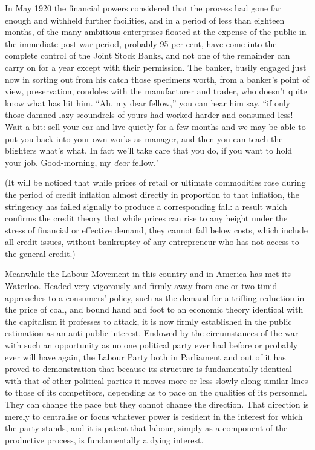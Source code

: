 \documentclass{book}
\begin{document}
In May 1920 the financial powers considered that the process had gone far enough and withheld further facilities, and in a period of less than eighteen months, of the many ambitious enterprises floated at the expense of the public in the immediate post-war period, probably 95 per cent, have come into the complete control of the Joint Stock Banks, and not one of the remainder can carry on for a year except with their permission. The banker, busily engaged just now in sorting out from his catch those specimens worth, from a banker’s point of view, preservation, condoles with the manufacturer and trader, who doesn’t quite know what has hit him. “Ah, my dear fellow,” you can hear him say, “if only those damned lazy scoundrels of yours had worked harder and consumed less! Wait a bit: sell your car and live quietly for a few months and we may be able to put you back into your own works as manager, and then you can teach the blighters what’s what. In fact we’ll take care that you do, if you want to hold your job. Good-morning, my \emph{dear} fellow."

(It will be noticed that while prices of retail or ultimate commodities rose during the period of credit inflation almost directly in proportion to that inflation, the stringency has failed signally to produce a corresponding fall: a result which confirms the credit theory that while prices can rise to any height under the stress of financial or effective demand, they cannot fall below costs, which include all credit issues, without bankruptcy of any entrepreneur who has not access to the general credit.)

Meanwhile the Labour Movement in this country and in America has met its Waterloo. Headed very vigorously and firmly away from one or two timid approaches to a consumers’ policy, such as the demand for a trifling reduction in the price of coal, and bound hand and foot to an economic theory identical with the capitalism it professes to attack, it is now firmly established in the public estimation as an anti-public interest. Endowed by the circumstances of the war with such an opportunity as no one political party ever had before or probably ever will have again, the Labour Party both in Parliament and out of it has proved to demonstration that because its structure is fundamentally identical with that of other political parties it moves more or less slowly along similar lines to those of its competitors, depending as to pace on the qualities of its personnel. They can change the pace but they cannot change the direction. That direction is merely to centralise or focus whatever power is resident in the interest for which the party stands, and it is patent that labour, simply as a component of the productive process, is fundamentally a dying interest.
\end{document}
